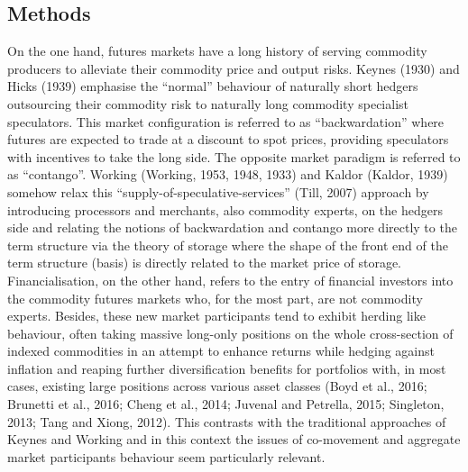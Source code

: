 \documentclass[]{elsarticle} %
\begin{document}
\hypertarget{methods}{%
\subsection{Methods}\label{methods}}

On the one hand, futures markets have a long history of serving commodity producers to alleviate their commodity price and output risks. Keynes (1930) and Hicks (1939) emphasise the ``normal'' behaviour of naturally short hedgers outsourcing their commodity risk to naturally long commodity specialist speculators. This market configuration is referred to as ``backwardation'' where futures are expected to trade at a discount to spot prices, providing speculators with incentives to take the long side. The opposite market paradigm is referred to as ``contango''. Working (Working, 1953, 1948, 1933) and Kaldor (Kaldor, 1939) somehow relax this ``supply-of-speculative-services'' (Till, 2007) approach by introducing processors and merchants, also commodity experts, on the hedgers side and relating the notions of backwardation and contango more directly to the term structure via the theory of storage where the shape of the front end of the term structure (basis) is directly related to the market price of storage.\\
Financialisation, on the other hand, refers to the entry of financial investors into the commodity futures markets who, for the most part, are not commodity experts. Besides, these new market participants tend to exhibit herding like behaviour, often taking massive long-only positions on the whole cross-section of indexed commodities in an attempt to enhance returns while hedging against inflation and reaping further diversification benefits for portfolios with, in most cases, existing large positions across various asset classes (Boyd et al., 2016; Brunetti et al., 2016; Cheng et al., 2014; Juvenal and Petrella, 2015; Singleton, 2013; Tang and Xiong, 2012). This contrasts with the traditional approaches of Keynes and Working and in this context the issues of co-movement and aggregate market participants behaviour seem particularly relevant.

\medskip\setlength{\parindent}{0pt}
\end{document}
